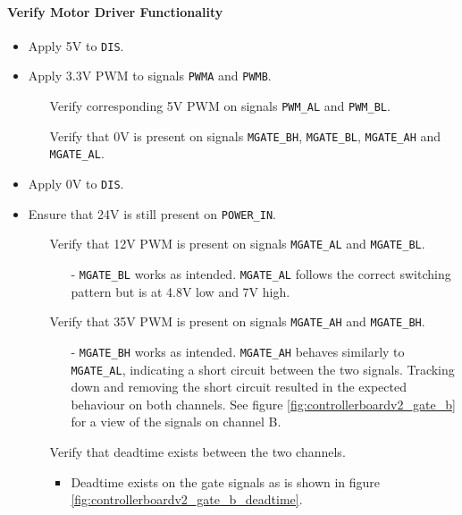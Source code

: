 \paragraph{Verify Motor Driver Functionality} %
\label{par:verify_motor_driver_functionality}
\begin{itemize}
	\item Apply 5V to \texttt{DIS}.
	\item Apply 3.3V PWM to signals \texttt{PWMA} and \texttt{PWMB}.
	\begin{itemize}
		\item[\cmark] Verify corresponding 5V PWM on signals \texttt{PWM\_AL} and \texttt{PWM\_BL}.
		\item[\cmark] Verify that 0V is present on signals \texttt{MGATE\_BH}, \texttt{MGATE\_BL}, \texttt{MGATE\_AH} and \texttt{MGATE\_AL}.
	\end{itemize}
	\item Apply 0V to \texttt{DIS}.
	\item Ensure that 24V is still present on \texttt{POWER\_IN}.
	\begin{itemize}
		\item[\xmark] Verify that 12V PWM is present on signals \texttt{MGATE\_AL} and \texttt{MGATE\_BL}.
		\begin{itemize}
			\item[-] \texttt{MGATE\_BL} works as intended.
			\texttt{MGATE\_AL} follows the correct switching pattern but is at 4.8V low and 7V high.  
		\end{itemize}
		\item[\xmark] Verify that 35V PWM is present on signals \texttt{MGATE\_AH} and \texttt{MGATE\_BH}.
		\begin{itemize}
			\item [-] \texttt{MGATE\_BH} works as intended.
			\texttt{MGATE\_AH} behaves similarly to \texttt{MGATE\_AL}, indicating a short circuit between the two signals.
			Tracking down and removing the short circuit resulted in the expected behaviour on both channels.
			See figure \ref{fig:controllerboardv2_gate_b} for a view of the signals on channel B.
		\end{itemize}
		\item[\cmark] Verify that deadtime exists between the two channels.
		\begin{itemize}
			\item Deadtime exists on the gate signals as is shown in figure \ref{fig:controllerboardv2_gate_b_deadtime}.
		\end{itemize}
	\end{itemize}
\end{itemize}


